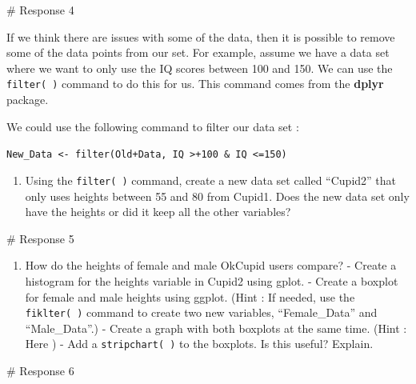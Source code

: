 \documentclass[
  letterpaper,
  DIV=11,
  numbers=noendperiod]{scrreprt}
\newenvironment{Shaded}{\begin{snugshade}}{\end{snugshade}}
\newcommand{\CommentTok}[1]{\textcolor[rgb]{0.37,0.37,0.37}{#1}}
\providecommand{\tightlist}{%
  \setlength{\itemsep}{0pt}\setlength{\parskip}{0pt}}\usepackage{longtable,booktabs,array}
\begin{document}
\begin{Shaded}
\begin{Highlighting}[]
\CommentTok{\# Response 4}
\end{Highlighting}
\end{Shaded}

If we think there are issues with some of the data, then it is possible
to remove some of the data points from our set. For example, assume we
have a data set where we want to only use the IQ scores between 100 and
150. We can use the \texttt{filter(\ )} command to do this for us. This
command comes from the \textbf{dplyr} package.

We could use the following command to filter our data set :

\texttt{New\_Data\ \textless{}-\ filter(Old+Data,\ IQ\ \textgreater{}+100\ \&\ IQ\ \textless{}=150)}

\begin{enumerate}
\def\labelenumi{\arabic{enumi}.}
\setcounter{enumi}{4}
\tightlist
\item
  Using the \texttt{filter(\ )} command, create a new data set called
  ``Cupid2'' that only uses heights between 55 and 80 from Cupid1. Does
  the new data set only have the heights or did it keep all the other
  variables?
\end{enumerate}

\begin{Shaded}
\begin{Highlighting}[]
\CommentTok{\# Response 5}
\end{Highlighting}
\end{Shaded}

\begin{enumerate}
\def\labelenumi{\arabic{enumi}.}
\setcounter{enumi}{5}
\tightlist
\item
  How do the heights of female and male OkCupid users compare? - Create
  a histogram for the heights variable in Cupid2 using gplot. - Create a
  boxplot for female and male heights using ggplot. (Hint : If needed,
  use the \texttt{fiklter(\ )} command to create two new variables,
  ``Female\_Data'' and ``Male\_Data''.) - Create a graph with both
  boxplots at the same time. (Hint : Here ) - Add a
  \texttt{stripchart(\ )} to the boxplots. Is this useful? Explain.
\end{enumerate}

\begin{Shaded}
\begin{Highlighting}[]
\CommentTok{\# Response 6}
\end{Highlighting}
\end{Shaded}
\end{document}
